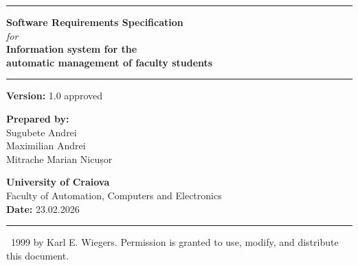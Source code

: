 \documentclass[11pt, a4paper]{article}
\begin{document}
\begin{titlepage}
    \begin{center}
        \vspace*{1cm}
        
        \textcolor{PrimaryColor}{\rule{\textwidth}{1.5pt}}\vspace{0.5cm}
        
        {\Huge \bfseries \textcolor{PrimaryColor}{Software Requirements Specification}} \\[0.5cm]
        {\Large \textit{for}} \\[0.5cm]
        {\LARGE \bfseries Information system for the} \\
        {\LARGE \bfseries automatic management of faculty students}
        
        \vspace{0.5cm}\textcolor{PrimaryColor}{\rule{\textwidth}{1.5pt}}
        
        \vspace{1.5cm}
        {\Large \textbf{Version:} 1.0 approved}
        
        \vfill
        
        \begin{flushleft}
            {\Large \textbf{Prepared by:}} \\[0.3cm]
            {\large Sugubete Andrei} \\
            {\large Maximilian Andrei} \\
            {\large Mitrache Marian Nicușor}
        \end{flushleft}
        
        \vspace{1.5cm}
        
        \begin{flushright}
            {\Large \textbf{University of Craiova}} \\[0.2cm]
            {\large Faculty of Automation, Computers and Electronics} \\[0.2cm]
            {\large \textbf{Date:} 23.02.2026}
        \end{flushright}
        
        \vspace{2cm}
        \rule{\textwidth}{0.5pt}\vspace{0.2cm}
        
        \footnotesize \textcopyright\ 1999 by Karl E. Wiegers. Permission is granted to use, modify, and distribute this document.
    \end{center}
\end{titlepage}
\end{document}
